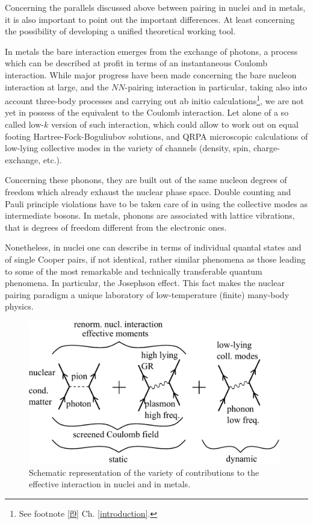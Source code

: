 Concerning the parallels discussed above between pairing in nuclei and in metals, it is also important to point  out the important differences. At least concerning the possibility of developing a unified theoretical working tool. 

In metals the bare interaction emerges from the exchange of photons, a process which can be described at profit in terms of an instantaneous Coulomb interaction. While major progress have been made concerning the bare nucleon interaction at large, and the $NN$-pairing interaction in particular, taking also into account three-body processes and carrying out ab initio calculations\footnote{See footnote \ref{f9} Ch. \ref{introduction}.}, we are not yet in possess of the equivalent to the Coulomb interaction.  Let alone of a so called low-$k$ version of such interaction, which could allow to work out on equal footing Hartree-Fock-Boguliubov solutions, and QRPA microscopic calculations of low-lying collective modes in the variety of channels (density, spin, charge-exchange, etc.).

Concerning these phonons, they are built out of the same nucleon degrees of freedom which already exhaust the nuclear phase space. Double counting and Pauli principle violations have to be taken care of in using the collective modes as intermediate bosons. In metals, phonons are associated with lattice vibrations, that is degrees of freedom different from the electronic ones.


Nonetheless, in nuclei one can describe in terms of individual quantal states and of single Cooper pairs, if not identical, rather similar phenomena as those leading to some of the most remarkable and technically transferable quantum phenomena. In particular, the Josephson effect. This fact makes the nuclear pairing paradigm a unique laboratory of low-temperature (finite) many-body physics. 
   \begin{figure}
   	\centerline{\includegraphics*[width=11cm,angle=0	]{nutshell/figs/fig3A4}}
   	\caption{Schematic representation of the variety of contributions to the effective interaction in nuclei and in metals.}\label{fig3.A.4}
   \end{figure}


